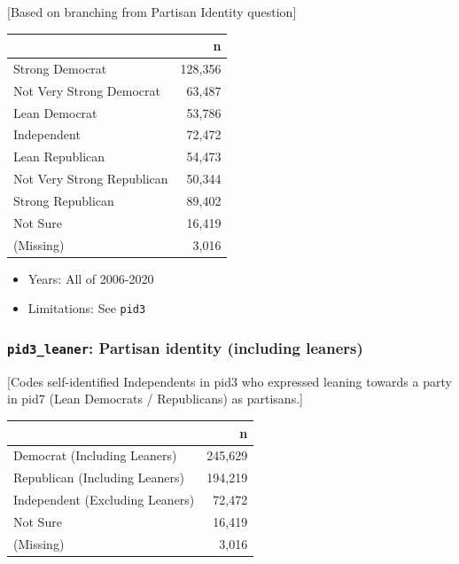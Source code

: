 \documentclass[10pt,article,oneside]{memoir}
\theoremstyle{definition}
\begin{document}
{[}Based on branching from Partisan Identity question{]}

\begin{table}[H]
\centering
\begin{tabular}{lr}
\toprule
 & n\\
\midrule
Strong Democrat & 128,356\\
Not Very Strong Democrat & 63,487\\
Lean Democrat & 53,786\\
Independent & 72,472\\
Lean Republican & 54,473\\
Not Very Strong Republican & 50,344\\
Strong Republican & 89,402\\
Not Sure & 16,419\\
(Missing) & 3,016\\
\bottomrule
\end{tabular}
\end{table}

\begin{itemize}
\tightlist
\item
  Years: All of 2006-2020
\item
  Limitations: See \texttt{pid3}
\end{itemize}

\hypertarget{pid3_leaner-partisan-identity-including-leaners}{%
\subsubsection{\texorpdfstring{\texttt{pid3\_leaner}: Partisan identity
(including
leaners)}{pid3\_leaner: Partisan identity (including leaners)}}\label{pid3_leaner-partisan-identity-including-leaners}}

{[}Codes self-identified Independents in pid3 who expressed leaning
towards a party in pid7 (Lean Democrats / Republicans) as partisans.{]}

\begin{table}[H]
\centering
\begin{tabular}{lr}
\toprule
 & n\\
\midrule
Democrat (Including Leaners) & 245,629\\
Republican (Including Leaners) & 194,219\\
Independent (Excluding Leaners) & 72,472\\
Not Sure & 16,419\\
(Missing) & 3,016\\
\bottomrule
\end{tabular}
\end{table}
\end{document}
